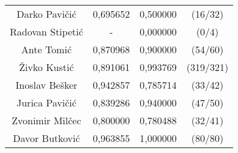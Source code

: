 \documentclass{article}
\begin{document}
\begin{table}[ht]
\begin{tabular}{c c c c}
Darko Pavičić & 0,695652 & 0,500000 & (16/32) \\
Radovan Stipetić & - & 0,000000 & (0/4) \\
Ante Tomić & 0,870968 & 0,900000 & (54/60) \\
Živko Kustić & 0,891061 & 0,993769 & (319/321) \\
Inoslav Bešker & 0,942857 & 0,785714 & (33/42) \\
Jurica Pavičić & 0,839286 & 0,940000 & (47/50) \\
Zvonimir Milčec & 0,800000 & 0,780488 & (32/41) \\
Davor Butković & 0,963855 & 1,000000 & (80/80) \\ [1ex]
\hline
\end{tabular}
\label{tbl:eval-detalji}
\end{table}

\newpage
\end{document}
